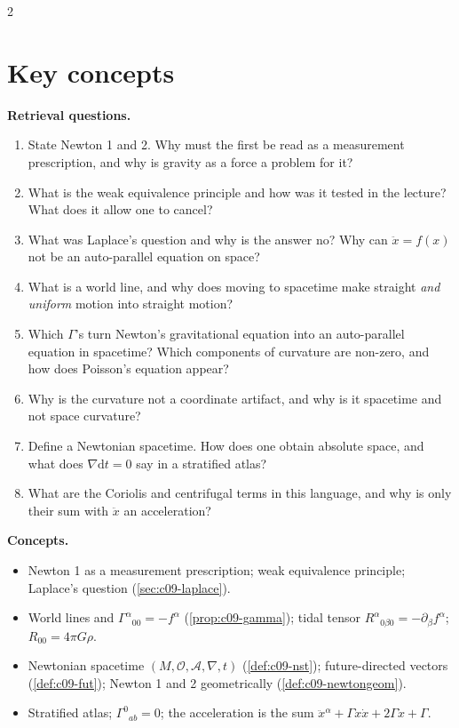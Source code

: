 \begin{paracol}{2}
\section*{Key concepts}
\begin{keyconcepts}
\textbf{Retrieval questions.}
\begin{enumerate}
  \item State Newton 1 and 2. Why must the first be read as a measurement prescription, and why is gravity as a force a problem for it?
  \item What is the weak equivalence principle and how was it tested in the lecture? What does it allow one to cancel?
  \item What was Laplace's question and why is the answer no? Why can $\ddot x=f(x)$ not be an auto-parallel equation on space?
  \item What is a world line, and why does moving to spacetime make straight \emph{and uniform} motion into straight motion?
  \item Which $\Gamma$'s turn Newton's gravitational equation into an auto-parallel equation in spacetime? Which components of curvature are non-zero, and how does Poisson's equation appear?
  \item Why is the curvature not a coordinate artifact, and why is it spacetime and not space curvature?
  \item Define a Newtonian spacetime. How does one obtain absolute space, and what does $\nabla\mathrm dt=0$ say in a stratified atlas?
  \item What are the Coriolis and centrifugal terms in this language, and why is only their sum with $\ddot x$ an acceleration?
\end{enumerate}
\textbf{Concepts.}
\begin{itemize}
  \item Newton 1 as a measurement prescription; weak equivalence principle; Laplace's question (\cref{sec:c09-laplace}).
  \item World lines and $\Gamma^\alpha{}_{00}=-f^\alpha$ (\cref{prop:c09-gamma}); tidal tensor $R^\alpha{}_{0\beta0}=-\partial_\beta f^\alpha$; $R_{00}=4\pi G\rho$.
  \item Newtonian spacetime $(M,\mathcal O,\mathcal A,\nabla,t)$ (\cref{def:c09-nst}); future-directed vectors (\cref{def:c09-fut}); Newton 1 and 2 geometrically (\cref{def:c09-newtongeom}).
  \item Stratified atlas; $\Gamma^0{}_{ab}=0$; the acceleration is the sum $\ddot x^\alpha+\Gamma\dot x\dot x+2\Gamma\dot x+\Gamma$.
\end{itemize}
\end{keyconcepts}

\flushside
\end{paracol}
